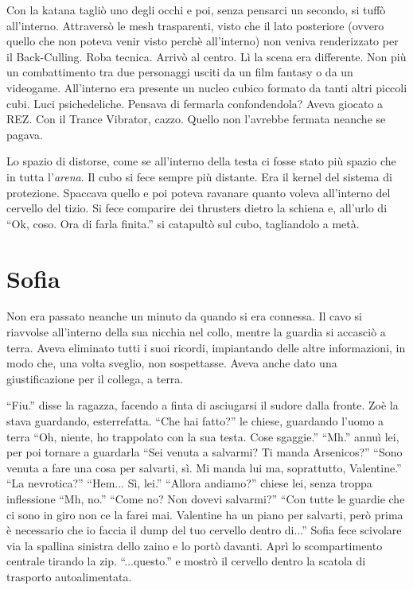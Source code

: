     Con la katana tagliò uno degli occhi e poi, senza pensarci un secondo, si tuffò all'interno. Attraversò le mesh
    trasparenti, visto che il lato posteriore (ovvero quello che non poteva venir visto perchè all'interno) non veniva
    renderizzato per il Back-Culling. Roba tecnica. Arrivò al centro. Lì la scena era differente. Non più un
    combattimento tra due personaggi usciti da un film fantasy o da un videogame. All'interno era presente un nucleo
    cubico formato da tanti altri piccoli cubi. Luci psichedeliche. Pensava di fermarla confondendola? Aveva giocato a
    REZ. Con il Trance Vibrator, cazzo. Quello non l'avrebbe fermata neanche se pagava.

    Lo spazio di distorse, come se all'interno della testa ci fosse stato più spazio che in tutta l'\emph{arena}. Il
    cubo si fece sempre più distante. Era il kernel del sistema di protezione. Spaccava quello e poi poteva ravanare
    quanto voleva all'interno del cervello del tizio. Si fece comparire dei thrusters dietro la schiena e, all'urlo di
    ``Ok, coso. Ora di farla finita.'' si catapultò sul cubo, tagliandolo a metà.

  \section*{Sofia}

    Non era passato neanche un minuto da quando si era connessa. Il cavo si riavvolse all'interno della sua nicchia nel
    collo, mentre la guardia si accasciò a terra. Aveva eliminato tutti i suoi ricordi, impiantando delle altre
    informazioni, in modo che, una volta sveglio, non sospettasse. Aveva anche dato una giustificazione per il collega,
    a terra.

    ``Fiu.'' disse la ragazza, facendo a finta di asciugarsi il sudore dalla fronte. Zoè la stava guardando,
    esterrefatta. ``Che hai fatto?'' le chiese, guardando l'uomo a terra ``Oh, niente, ho trappolato con la sua testa.
    Cose sgaggie.'' ``Mh.'' annuì lei, per poi tornare a guardarla ``Sei venuta a salvarmi? Ti manda Arsenicos?'' ``Sono
    venuta a fare una cosa per salvarti, sì. Mi manda lui ma, soprattutto, Valentine.'' ``La nevrotica?'' ``Hem... Sì,
    lei.'' ``Allora andiamo?'' chiese lei, senza troppa inflessione ``Mh, no.'' ``Come no? Non dovevi salvarmi?'' ``Con
    tutte le guardie che ci sono in giro non ce la farei mai. Valentine ha un piano per salvarti, però prima è
    necessario che io faccia il dump del tuo cervello dentro di...'' Sofia fece scivolare via la spallina sinistra dello
    zaino e lo portò davanti. Aprì lo scompartimento centrale tirando la zip. ``...questo.'' e mostrò il cervello dentro
    la scatola di trasporto autoalimentata.

